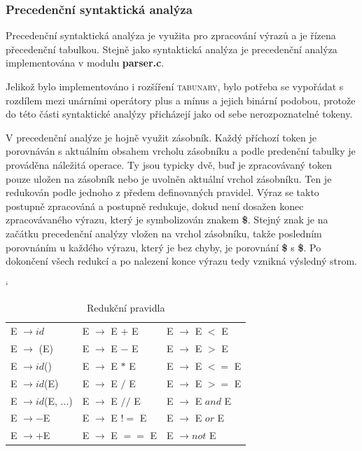 \documentclass[12pt]{article}
\begin{document}
\subsubsection{Precedenční syntaktická analýza}
Precedenční syntaktická analýza je využita pro zpracování výrazů a je řízena přecedenční tabulkou. Stejně jako syntaktická analýza je precedenční analýza implementována v modulu \textbf{parser.c}.

Jelikož bylo implementováno i rozšíření \textsc{tabunary}, bylo potřeba se vypořádat s rozdílem mezi unárními operátory plus a mínus a jejich binární podobou, protože do této části syntaktické analýzy přicházejí jako od sebe nerozpoznatelné tokeny. 

V precedenční analýze je hojně využit zásobník. Každý příchozí token je porovnáván s aktuálním obsahem vrcholu zásobníku a podle predenční tabulky je prováděna náležitá operace. Ty jsou typicky dvě, buď je zpracovávaný token pouze uložen na zásobník nebo je uvolněn aktuální vrchol zásobníku. Ten je redukován podle jednoho z předem definovaných pravidel. Výraz se takto postupně zpracováná a postupně redukuje, dokud není dosažen konec zpracovávaného výrazu, který je symbolizován znakem \textbf{\$}. Stejný znak je na začátku precedenční analýzy vložen na vrchol zásobníku, takže posledním porovnáním u každého výrazu, který je bez chyby, je porovnání \textbf{\$} s \textbf{\$}. Po dokončení všech redukcí a po nalezení konce výrazu tedy vznikná výsledný strom.
\begin{table}[!htbp]
\catcode`
\centering
    \begin{tabular}{l l l}
         E $\rightarrow id$ & E $\rightarrow$ E $+$ E & E $\rightarrow$ E $<$ E \\
         E $\rightarrow $ (E) & E $\rightarrow$ E $-$ E & E $\rightarrow$ E $>$ E \\
         E $\rightarrow id$() & E $\rightarrow$ E $*$ E & E $\rightarrow$ E $<=$ E \\
         E $\rightarrow id$(E) & E $\rightarrow$ E $/$ E & E $\rightarrow$ E $>=$ E \\
         E $\rightarrow id$(E, ...) & E $\rightarrow$ E $//$ E & E $\rightarrow$ E $and$ E \\
         E $\rightarrow -$E & E $\rightarrow$ E $!=$ E & E $\rightarrow$ E $or$ E \\
         E $\rightarrow +$E & E $\rightarrow$ E $==$ E & E $\rightarrow not$ E \\
    \end{tabular}
    \caption{Redukční pravidla}
    \label{tab:2}
\end{table}
\end{document}

